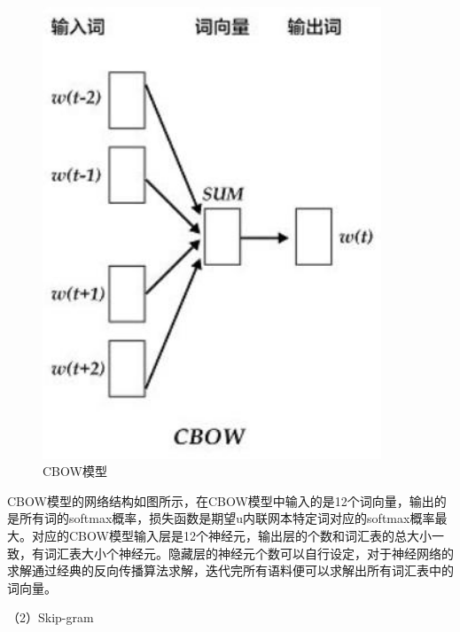 \documentclass[winfonts,master,oneside,nobackinfo]{njuthesis}
\begin{document}
\begin{figure}[h]
\centering
\begin{minipage}[t]{0.5\textwidth}
\includegraphics[width=0.9\textwidth]{./figure/CBOW模型.jpg}
\caption{CBOW模型}
\label{lab:1}
\end{minipage}
\end{figure}

CBOW模型的网络结构如图所示，在CBOW模型中输入的是12个词向量，输出的是所有词的softmax概率，损失函数是期望u内联网本特定词对应的softmax概率最大。对应的CBOW模型输入层是12个神经元，输出层的个数和词汇表的总大小一致，有词汇表大小个神经元。隐藏层的神经元个数可以自行设定，对于神经网络的求解通过经典的反向传播算法求解，迭代完所有语料便可以求解出所有词汇表中的词向量。

（2）Skip-gram
\end{document}
